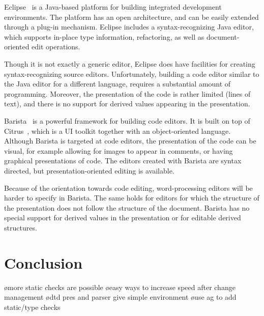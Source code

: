 \documentclass[12pt]{article}
\begin{document}


\noindent Eclipse~\cite{eclipse2001} is a Java-based platform for building integrated development environments. The platform has an open architecture, and can be easily extended through a plug-in mechanism. Eclipse includes a syntax-recognizing Java editor, which supports in-place type information, refactoring, as well as document-oriented edit operations. 

Though it is not exactly a generic editor, Eclipse does have facilities for creating syntax-recognizing source editors. Unfortunately, building a code editor similar to the Java editor for a different language, requires a substantial amount of programming. Moreover, the presentation of the code is rather limited (lines of text), and there is no support for derived values appearing in the presentation.


\noindent Barista~\cite{KoMyers06Barista} is a powerful framework for building code editors. It is built on top of Citrus~\cite{KoMyers05Citrus}, which is a UI toolkit together with an object-oriented language. Although Barista is targeted at code editors, the presentation of the code can be visual, for example allowing for images to appear in comments, or having graphical presentations of code. The editors created with Barista are syntax directed, but presentation-oriented editing is available. 

Because of the orientation towards code editing, word-processing editors will be harder to specify in Barista. The same holds for editors for which the structure of the presentation does not follow the structure of the document. Barista has no special support for derived values in the presentation or for editable derived structures.



%
\section{Conclusion} 
%

\bl
\o more static checks are possible
\o easy ways to increase speed after change management
\o dtd pres and parser give simple environment
\o use ag to add static/type checks
\el

%



\end{document}
